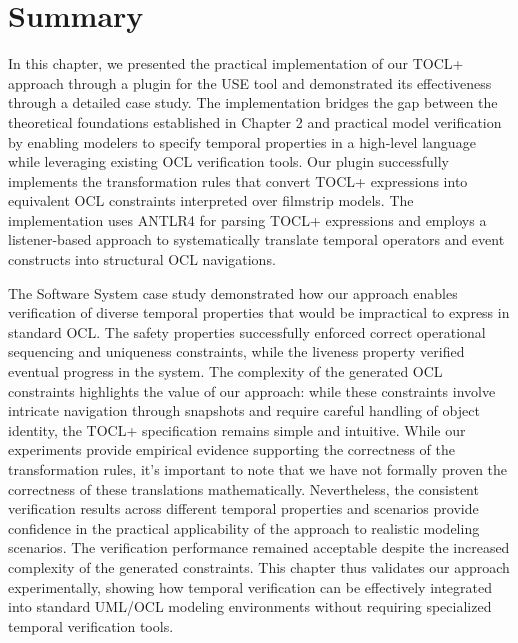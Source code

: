 \section{Summary}
\hspace{1cm} In this chapter, we presented the practical implementation of our TOCL+ 
approach through a plugin for the USE tool and demonstrated its effectiveness through 
a detailed case study. The implementation bridges the gap between the theoretical 
foundations established in Chapter 2 and practical model verification by enabling 
modelers to specify temporal properties in a high-level language while leveraging 
existing OCL verification tools. Our plugin successfully implements the transformation 
rules that convert TOCL+ expressions into equivalent OCL constraints interpreted 
over filmstrip models. The implementation uses ANTLR4 for parsing TOCL+ expressions 
and employs a listener-based approach to systematically translate temporal operators 
and event constructs into structural OCL navigations.

The Software System case study demonstrated how our approach enables verification 
of diverse temporal properties that would be impractical to express in standard OCL. 
The safety properties successfully enforced correct operational sequencing and 
uniqueness constraints, while the liveness property verified eventual progress in 
the system. The complexity of the generated OCL constraints highlights the value of 
our approach: while these constraints involve intricate navigation through snapshots 
and require careful handling of object identity, the TOCL+ specification remains 
simple and intuitive. While our experiments provide empirical evidence supporting 
the correctness of the transformation rules, it's important to note that we have not 
formally proven the correctness of these translations mathematically. Nevertheless, 
the consistent verification results across different temporal properties and scenarios 
provide confidence in the practical applicability of the approach to realistic 
modeling scenarios. The verification performance remained acceptable despite the 
increased complexity of the generated constraints. This chapter thus validates our 
approach experimentally, showing how temporal verification can be effectively integrated 
into standard UML/OCL modeling environments without requiring specialized temporal 
verification tools.

